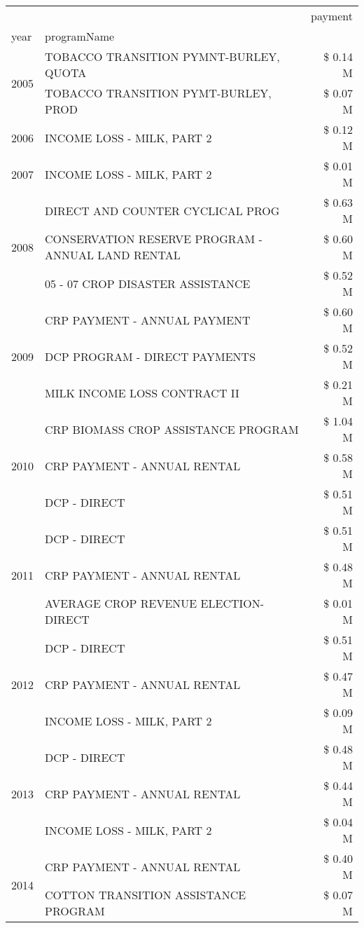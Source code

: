\begin{tabular}{llr}
\toprule
 &  & payment \\
year & programName &  \\
\midrule
\multirow[t]{2}{*}{2005} & TOBACCO TRANSITION PYMNT-BURLEY, QUOTA & \$ 0.14 M \\
 & TOBACCO TRANSITION PYMT-BURLEY, PROD & \$ 0.07 M \\
\cline{1-3}
2006 & INCOME LOSS - MILK, PART 2 & \$ 0.12 M \\
\cline{1-3}
2007 & INCOME LOSS - MILK, PART 2 & \$ 0.01 M \\
\cline{1-3}
\multirow[t]{3}{*}{2008} & DIRECT AND COUNTER CYCLICAL PROG & \$ 0.63 M \\
 & CONSERVATION RESERVE PROGRAM - ANNUAL LAND RENTAL & \$ 0.60 M \\
 & 05 - 07 CROP DISASTER ASSISTANCE & \$ 0.52 M \\
\cline{1-3}
\multirow[t]{3}{*}{2009} & CRP PAYMENT - ANNUAL PAYMENT & \$ 0.60 M \\
 & DCP PROGRAM - DIRECT PAYMENTS & \$ 0.52 M \\
 & MILK INCOME LOSS CONTRACT II & \$ 0.21 M \\
\cline{1-3}
\multirow[t]{3}{*}{2010} & CRP BIOMASS CROP ASSISTANCE PROGRAM & \$ 1.04 M \\
 & CRP PAYMENT - ANNUAL RENTAL & \$ 0.58 M \\
 & DCP - DIRECT & \$ 0.51 M \\
\cline{1-3}
\multirow[t]{3}{*}{2011} & DCP - DIRECT & \$ 0.51 M \\
 & CRP PAYMENT - ANNUAL RENTAL & \$ 0.48 M \\
 & AVERAGE CROP REVENUE ELECTION-DIRECT & \$ 0.01 M \\
\cline{1-3}
\multirow[t]{3}{*}{2012} & DCP - DIRECT & \$ 0.51 M \\
 & CRP PAYMENT - ANNUAL RENTAL & \$ 0.47 M \\
 & INCOME LOSS - MILK, PART 2 & \$ 0.09 M \\
\cline{1-3}
\multirow[t]{3}{*}{2013} & DCP - DIRECT & \$ 0.48 M \\
 & CRP PAYMENT - ANNUAL RENTAL & \$ 0.44 M \\
 & INCOME LOSS - MILK, PART 2 & \$ 0.04 M \\
\cline{1-3}
\multirow[t]{2}{*}{2014} & CRP PAYMENT - ANNUAL RENTAL & \$ 0.40 M \\
 & COTTON TRANSITION ASSISTANCE PROGRAM & \$ 0.07 M \\
\cline{1-3}

\end{tabular}
